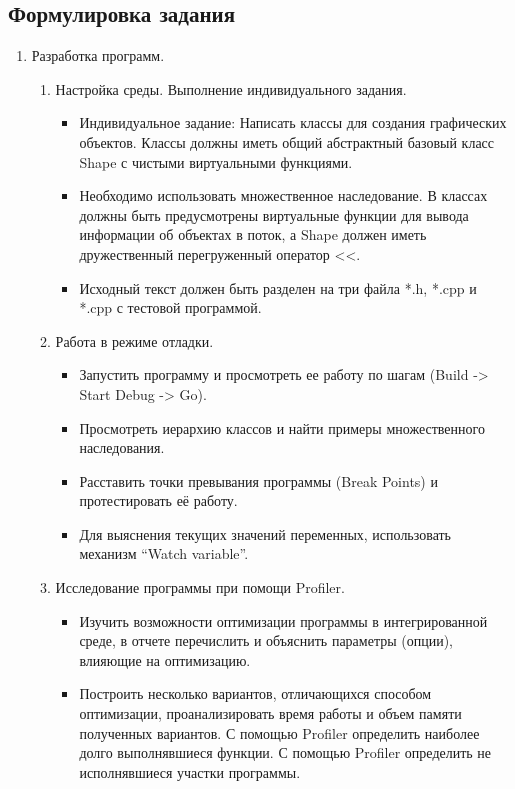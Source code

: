 \documentclass[a4paper, 14pt]{extarticle}
\begin{document}
\subsection{Формулировка задания}
\begin{enumerate}
    \item Разработка программ.
    \begin{enumerate}
        \item Настройка среды. Выполнение индивидуального задания.
        \begin{itemize}
            \item Индивидуальное задание: Написать классы для создания графических объектов. Классы должны иметь общий абстрактный базовый класс Shape с чистыми виртуальными функциями.
            \item Необходимо использовать множественное наследование. В классах должны быть предусмотрены виртуальные функции для вывода информации об объектах в поток, а Shape должен иметь дружественный перегруженный оператор <<.
            \item Исходный текст должен быть разделен на три файла *.h, *.cpp и *.cpp с тестовой программой.
        \end{itemize}
        \item Работа в режиме отладки.
        \begin{itemize}
            \item Запустить программу и просмотреть ее работу по шагам (Build -> Start Debug -> Go).
            \item Просмотреть иерархию классов и найти примеры множественного наследования.
            \item Расставить точки превывания программы (Break Points) и протестировать её работу.
            \item Для выяснения текущих значений переменных, использовать механизм ``Watch variable''.
        \end{itemize}
        \item Исследование программы при помощи Profiler.
        \begin{itemize}
            \item Изучить возможности оптимизации программы в интегрированной среде, в отчете перечислить и объяснить параметры (опции), влияющие на оптимизацию.
            \item Построить несколько вариантов, отличающихся способом оптимизации, проанализировать время работы и объем памяти полученных вариантов. С помощью Profiler определить наиболее долго выполнявшиеся функции. С помощью Profiler определить не исполнявшиеся участки программы.

\end{itemize}
\end{enumerate}
\end{enumerate}
\end{document}
